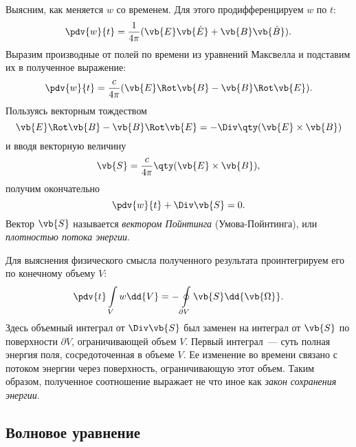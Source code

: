 \documentclass[\docroot/reports/lectures-draft/report.tex]{subfiles}
\begin{document}
    Выясним, как меняется $w$ со временем. Для этого продифференцируем $w$ по $t$:
    \begin{equation*}
        \pdv{w}{t} = \frac{1}{4 \pi} (\vb{E}\vb{\dot{E}} + \vb{B}\vb{\dot{B}}) .
    \end{equation*}
    Выразим производные от полей по времени из уравнений Максвелла и подставим их в полученное выражение:
    \begin{equation*}
        \pdv{w}{t} = \frac{c}{4 \pi} (\vb{E} \Rot \vb{B} - \vb{B} \Rot \vb{E}) .
    \end{equation*}
    Пользуясь векторным тождеством
    \begin{equation*}
        \vb{E} \Rot \vb{B} - \vb{B} \Rot \vb{E} = - \Div \qty(\vb{E} \times \vb{B})
    \end{equation*}
    и вводя векторную величину
    \begin{equation*}
        \vb{S} = \frac{c}{4 \pi} \qty(\vb{E} \times \vb{B}) ,
    \end{equation*}
    получим окончательно
    \begin{equation*}
        \pdv{w}{t} + \Div \vb{S} = 0 .
    \end{equation*}
    Вектор $\vb{S}$ называется \textit{вектором Пойнтинга} (Умова-Пойнтинга), или \textit{плотностью потока энергии}.

    Для выяснения физического смысла полученного результата проинтегрируем его по конечному объему $V$:
    \begin{equation*}
        \pdv{t} \int\limits_V w \dd{V} = - \oint\limits_{\partial V} \vb{S} \dd{\vb{\Omega}} .
    \end{equation*}
    Здесь объемный интеграл от $\Div \vb{S}$ был заменен на интеграл от $\vb{S}$ по поверхности $\partial V$, ограничивающей объем $V$. Первый интеграл~--- суть полная энергия поля, сосредоточенная в объеме $V$. Ее изменение во времени связано с потоком энергии через поверхность, ограничивающую этот объем. Таким образом, полученное соотношение выражает не что иное как \textit{закон сохранения энергии}.

\subsection{Волновое уравнение}
\end{document}
